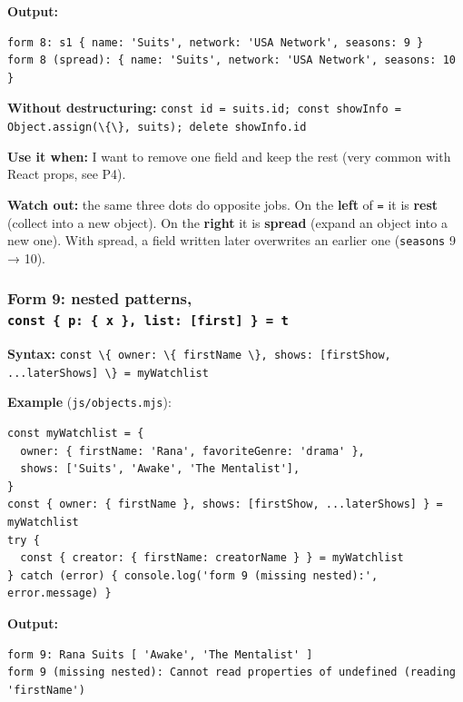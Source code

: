 \documentclass[
  10pt,
]{article}
\newcommand{\passthrough}[1]{#1}
\begin{document}
\textbf{Output:}

\begin{lstlisting}
form 8: s1 { name: 'Suits', network: 'USA Network', seasons: 9 }
form 8 (spread): { name: 'Suits', network: 'USA Network', seasons: 10 }
\end{lstlisting}

\textbf{Without destructuring:}
\passthrough{\lstinline!const id = suits.id; const showInfo = Object.assign(\{\}, suits); delete showInfo.id!}

\textbf{Use it when:} I want to remove one field and keep the rest (very
common with React props, see P4).

\textbf{Watch out:} the same three dots do opposite jobs. On the
\textbf{left} of \passthrough{\lstinline!=!} it is \textbf{rest}
(collect into a new object). On the \textbf{right} it is \textbf{spread}
(expand an object into a new one). With spread, a field written later
overwrites an earlier one (\passthrough{\lstinline!seasons!} 9 → 10).

\hypertarget{form-9-nested-patterns-const-p-x-list-first-t}{%
\subsubsection{\texorpdfstring{Form 9: nested patterns,
\texttt{const\ \{\ p:\ \{\ x\ \},\ list:\ {[}first{]}\ \}\ =\ t}}{Form 9: nested patterns, const \{ p: \{ x \}, list: {[}first{]} \} = t}}\label{form-9-nested-patterns-const-p-x-list-first-t}}

\textbf{Syntax:}
\passthrough{\lstinline!const \{ owner: \{ firstName \}, shows: [firstShow, ...laterShows] \} = myWatchlist!}

\textbf{Example} (\passthrough{\lstinline!js/objects.mjs!}):

\begin{lstlisting}
const myWatchlist = {
  owner: { firstName: 'Rana', favoriteGenre: 'drama' },
  shows: ['Suits', 'Awake', 'The Mentalist'],
}
const { owner: { firstName }, shows: [firstShow, ...laterShows] } = myWatchlist
try {
  const { creator: { firstName: creatorName } } = myWatchlist
} catch (error) { console.log('form 9 (missing nested):', error.message) }
\end{lstlisting}

\textbf{Output:}

\begin{lstlisting}
form 9: Rana Suits [ 'Awake', 'The Mentalist' ]
form 9 (missing nested): Cannot read properties of undefined (reading 'firstName')
\end{lstlisting}
\end{document}
